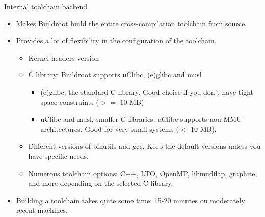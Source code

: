 \begin{frame}{Internal toolchain backend}
  \begin{itemize}
  \item Makes Buildroot build the entire cross-compilation toolchain
    from source.
  \item Provides a lot of flexibility in the configuration of the
    toolchain.
    \begin{itemize}
    \item Kernel headers version
    \item C library: Buildroot supports uClibc, (e)glibc and musl
      \begin{itemize}
      \item (e)glibc, the standard C library. Good choice if you don't
        have tight space constraints ($>=$ 10 MB)
      \item uClibc and musl, smaller C libraries. uClibc supports
        non-MMU architectures. Good for very small systems ($<$ 10 MB).
      \end{itemize}
    \item Different versions of binutils and gcc. Keep the default
      versions unless you have specific needs.
    \item Numerous toolchain options: C++, LTO, OpenMP, libmudflap,
      graphite, and more depending on the selected C library.
    \end{itemize}
  \item Building a toolchain takes quite some time: 15-20 minutes on
    moderately recent machines.
  \end{itemize}
\end{frame}

